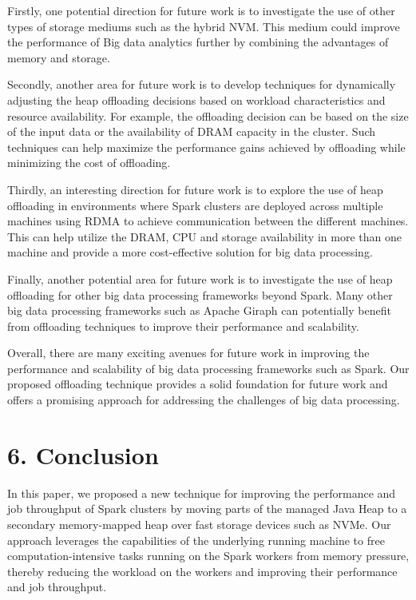 \documentclass[twocolumn,10pt]{asme2e}
\begin{document}
Firstly, one potential direction for future work is to investigate the use of other types of storage mediums such as the hybrid NVM. This medium could improve the performance of Big data analytics further by combining the advantages of memory and storage.

Secondly, another area for future work is to develop techniques for dynamically adjusting the heap offloading decisions based on workload characteristics and resource availability. For example, the offloading decision can be based on the size of the input data or the availability of DRAM capacity in the cluster. Such techniques can help maximize the performance gains achieved by offloading while minimizing the cost of offloading.

Thirdly, an interesting direction for future work is to explore the use of heap offloading in environments where Spark clusters are deployed across multiple machines using RDMA to achieve communication between the different machines. This can help utilize the DRAM, CPU and storage availability in more than one machine and provide a more cost-effective solution for big data processing.

Finally, another potential area for future work is to investigate the use of heap offloading for other big data processing frameworks beyond Spark. Many other big data processing frameworks such as Apache Giraph can potentially benefit from offloading techniques to improve their performance and scalability.

Overall, there are many exciting avenues for future work in improving the performance and scalability of big data processing frameworks such as Spark. Our proposed offloading technique provides a solid foundation for future work and offers a promising approach for addressing the challenges of big data processing.

\section*{6. Conclusion}

In this paper, we proposed a new technique for improving the performance and job throughput of Spark clusters by moving parts of the managed Java Heap to a secondary memory-mapped heap over fast storage devices such as NVMe. Our approach leverages the capabilities of the underlying running machine to free computation-intensive tasks running on the Spark workers from memory pressure, thereby reducing the workload on the workers and improving their performance and job throughput.
\end{document}
